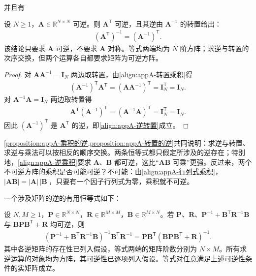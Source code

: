 \documentclass[../main.tex]{subfiles}
\begin{document}
并且有
\begin{proposition}[转置的逆]\label{proposition:appA-转置的逆}
设 $N\geqslant1$，$\bm{A}\in\mathbb{R}^{N\times N}$ 可逆。则 $\bm{A}^{\mathsf{T}}$ 可逆，且其逆由 $\bm{A}^{-1}$ 的转置给出：
\begin{align}
  (\bm{A}^{\mathsf{T}})^{-1}=(\bm{A}^{-1})^{\mathsf{T}}.
  \label{align:appA-逆转置}
\end{align}
该结论只要求 $\bm{A}$ 可逆，不要求 $\bm{A}$ 对称。等式两端均为 $N$ 阶方阵；求逆与转置的次序交换，但两个运算各自都要求矩阵为可逆方阵。
\end{proposition}

\begin{proof}
对 $\bm{A}\bm{A}^{-1}=\bm{I}_{N}$ 两边取转置，由\eqref{align:appA-转置乘积}得
\begin{align*}
 (\bm{A}^{-1})^{\mathsf{T}}\bm{A}^{\mathsf{T}}=(\bm{A}\bm{A}^{-1})^{\mathsf{T}}=\bm{I}_{N}^{\mathsf{T}}=\bm{I}_{N}.
\end{align*}
对 $\bm{A}^{-1}\bm{A}=\bm{I}_{N}$ 两边取转置得
\begin{align*}
 \bm{A}^{\mathsf{T}}(\bm{A}^{-1})^{\mathsf{T}}=(\bm{A}^{-1}\bm{A})^{\mathsf{T}}=\bm{I}_{N}^{\mathsf{T}}=\bm{I}_{N}.
\end{align*}
因此 $(\bm{A}^{-1})^{\mathsf{T}}$ 是 $\bm{A}^{\mathsf{T}}$ 的逆，即\eqref{align:appA-逆转置}成立。
\end{proof}

\begin{remark}
\cref{proposition:appA-乘积的逆,proposition:appA-转置的逆}共同说明：求逆与转置、求逆与乘法可以按相反的顺序交换。两条恒等式都只假定所涉及的逆存在；特别地，\eqref{align:appA-逆乘积}要求 $\bm{A}$、$\bm{B}$ 都可逆，这比“$\bm{A}\bm{B}$ 可乘”更强。反过来，两个不可逆方阵的乘积是否可能可逆？不可能：由\eqref{align:appA-行列式乘积}，$|\bm{A}\bm{B}|=|\bm{A}|\,|\bm{B}|$，只要有一个因子行列式为零，乘积就不可逆。
\end{remark}

一个涉及矩阵的逆的有用恒等式如下：
\begin{proposition}[矩阵求逆的一个恒等式]\label{proposition:appA-求逆恒等式}
设 $N,M\geqslant1$，$\bm{P}\in\mathbb{R}^{N\times N}$，$\bm{R}\in\mathbb{R}^{M\times M}$，$\bm{B}\in\mathbb{R}^{M\times N}$。若 $\bm{P}$、$\bm{R}$、$\bm{P}^{-1}+\bm{B}^{\mathsf{T}}\bm{R}^{-1}\bm{B}$ 与 $\bm{B}\bm{P}\bm{B}^{\mathsf{T}}+\bm{R}$ 均可逆，则
\begin{align}
  (\bm{P}^{-1}+\bm{B}^{\mathsf{T}}\bm{R}^{-1}\bm{B})^{-1}\bm{B}^{\mathsf{T}}\bm{R}^{-1}=\bm{P}\bm{B}^{\mathsf{T}}(\bm{B}\bm{P}\bm{B}^{\mathsf{T}}+\bm{R})^{-1}.
  \label{align:appA-求逆恒等式}
\end{align}
其中各逆矩阵的存在性已列入假设，等式两端的矩阵阶数分别为 $N\times M$。所有求逆运算的对象均为方阵，其可逆性已逐项列入假设。等式对任意满足上述可逆性条件的实矩阵成立。
\end{proposition}
\end{document}
